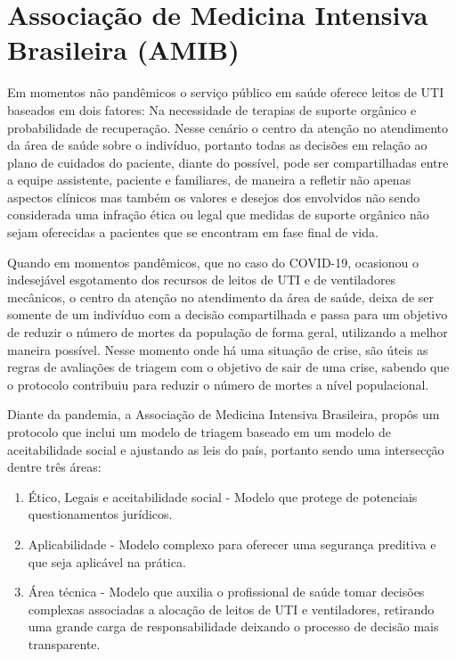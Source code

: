 \documentclass[12pt]{article}
\begin{document}
\section{Associação de Medicina Intensiva Brasileira (AMIB)}

Em momentos não pandêmicos o serviço público em saúde oferece leitos de UTI baseados em dois fatores: Na necessidade de terapias de suporte orgânico e probabilidade de recuperação. Nesse cenário o centro da atenção no atendimento da área de saúde sobre o indivíduo, portanto todas as decisões em relação ao plano de cuidados do paciente, diante do possível, pode ser compartilhadas entre a equipe assistente, paciente e familiares, de maneira a refletir não apenas aspectos clínicos mas também os valores e desejos dos envolvidos não sendo considerada uma infração ética ou legal que medidas de suporte orgânico não sejam oferecidas a pacientes que se encontram em fase final de vida. 

Quando em momentos pandêmicos, que no caso do COVID-19, ocasionou o indesejável esgotamento dos recursos de leitos de UTI e de ventiladores mecânicos, o centro da atenção no atendimento da área de saúde, deixa de ser somente de um indivíduo com a decisão compartilhada e passa para um objetivo de reduzir o número de mortes da população de forma geral, utilizando a melhor maneira possível. Nesse momento onde há uma situação de crise, são úteis as regras de avaliações de triagem com o objetivo de sair de uma crise, sabendo que o protocolo contribuiu para reduzir o número de mortes a nível populacional.

Diante da pandemia, a Associação de Medicina Intensiva Brasileira, propôs um protocolo que inclui um modelo de triagem baseado em um modelo de aceitabilidade social \cite{biddison2019too} e ajustando as leis do país, portanto sendo uma intersecção dentre três áreas: 
\begin{enumerate}
\item  Ético, Legais e aceitabilidade social - Modelo que protege de potenciais questionamentos jurídicos.
\item Aplicabilidade - Modelo complexo para oferecer uma segurança preditiva e que seja aplicável na prática.
\item Área técnica - Modelo que auxilia o profissional de saúde tomar decisões complexas associadas a alocação de leitos de UTI e ventiladores, retirando uma grande carga de responsabilidade deixando o processo de decisão mais transparente.
\end{enumerate}
\end{document}
